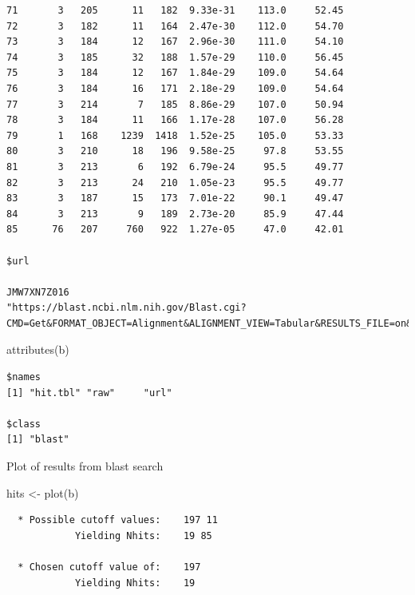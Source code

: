 \documentclass[
  letterpaper,
  DIV=11,
  numbers=noendperiod]{scrartcl}
\newenvironment{Shaded}{\begin{snugshade}}{\end{snugshade}}
\newcommand{\FunctionTok}[1]{\textcolor[rgb]{0.28,0.35,0.67}{#1}}
\newcommand{\NormalTok}[1]{\textcolor[rgb]{0.00,0.23,0.31}{#1}}
\newcommand{\OtherTok}[1]{\textcolor[rgb]{0.00,0.23,0.31}{#1}}
\begin{document}
\begin{verbatim}
71       3   205      11   182  9.33e-31    113.0     52.45
72       3   182      11   164  2.47e-30    112.0     54.70
73       3   184      12   167  2.96e-30    111.0     54.10
74       3   185      32   188  1.57e-29    110.0     56.45
75       3   184      12   167  1.84e-29    109.0     54.64
76       3   184      16   171  2.18e-29    109.0     54.64
77       3   214       7   185  8.86e-29    107.0     50.94
78       3   184      11   166  1.17e-28    107.0     56.28
79       1   168    1239  1418  1.52e-25    105.0     53.33
80       3   210      18   196  9.58e-25     97.8     53.55
81       3   213       6   192  6.79e-24     95.5     49.77
82       3   213      24   210  1.05e-23     95.5     49.77
83       3   187      15   173  7.01e-22     90.1     49.47
84       3   213       9   189  2.73e-20     85.9     47.44
85      76   207     760   922  1.27e-05     47.0     42.01

$url
                                                                                                                                                                          JMW7XN7Z016 
"https://blast.ncbi.nlm.nih.gov/Blast.cgi?CMD=Get&FORMAT_OBJECT=Alignment&ALIGNMENT_VIEW=Tabular&RESULTS_FILE=on&FORMAT_TYPE=CSV&ALIGNMENTS=20000&DESCRIPTIONS=20000&RID=JMW7XN7Z016" 
\end{verbatim}

\begin{Shaded}
\begin{Highlighting}[]
\FunctionTok{attributes}\NormalTok{(b)}
\end{Highlighting}
\end{Shaded}

\begin{verbatim}
$names
[1] "hit.tbl" "raw"     "url"    

$class
[1] "blast"
\end{verbatim}

Plot of results from blast search

\begin{Shaded}
\begin{Highlighting}[]
\NormalTok{hits }\OtherTok{\textless{}{-}} \FunctionTok{plot}\NormalTok{(b)}
\end{Highlighting}
\end{Shaded}

\begin{verbatim}
  * Possible cutoff values:    197 11 
            Yielding Nhits:    19 85 

  * Chosen cutoff value of:    197 
            Yielding Nhits:    19 
\end{verbatim}
\end{document}
